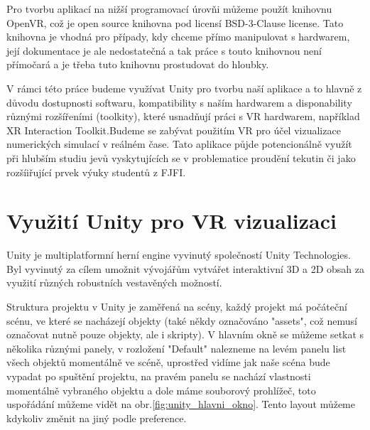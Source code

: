\documentclass[a4paper,oneside,12pt]{book}
\begin{document}
Pro tvorbu aplikací na nižší programovací úrovňi můžeme použít knihovnu OpenVR\cite{openvrdok}, což je open source knihovna pod licensí BSD-3-Clause license\cite{openvrdok}. Tato knihovna je vhodná pro případy, kdy chceme přímo manipulovat s hardwarem\cite{openvrdok}, její dokumentace je ale nedostatečná a tak práce s touto knihovnou není přímočará a je třeba tuto knihovnu prostudovat do hloubky.

V rámci této práce budeme využívat Unity pro tvorbu naší aplikace a to hlavně z důvodu dostupnosti softwaru, kompatibility s naším hardwarem\cite{unitypodpora} a disponability různými rozšířeními (toolkity), které usnadňují práci s VR hardwarem, například XR Interaction Toolkit\cite{unityxrinteract}.Budeme se zabývat použitím VR pro účel vizualizace numerických simulací v reálném čase. Tato aplikace půjde potencionálně využít při hlubším studiu jevů vyskytujících se v problematice proudění tekutin či jako rozšíiřující prvek výuky studentů z FJFI.



%

%


\chapter{Využití Unity pro VR vizualizaci}
Unity je multiplatformní herní engine vyvinutý společností Unity Technologies. Byl vyvinutý za cílem umožnit vývojářům vytvářet interaktivní 3D a 2D obsah za využití různých robustních vestavěných možností.

Struktura projektu v Unity je zaměřená na scény, každý projekt má počáteční scénu, ve které se nacházejí objekty (také někdy označováno "assets", což nemusí označovat nutně pouze objekty, ale i skripty). V hlavním okně se můžeme setkat s několika různými panely, v rozložení "Default" nalezneme na levém panelu list všech objektů momentálně ve scéně, uprostřed vidíme jak naše scéna bude vypadat po spuštění projektu, na pravém panelu se nachází vlastnosti momentálně vybraného objektu a dole máme souborový prohlížeč, toto uspořádání můžeme vidět na obr.\ref{fig:unity_hlavni_okno}. Tento layout můžeme kdykoliv změnit na jiný podle preference.
\end{document}
